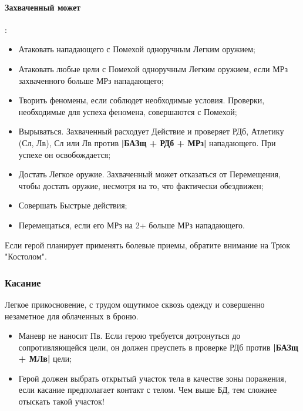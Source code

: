 \paragraph{Захваченный может}:
\begin{itemize}
  \item Атаковать нападающего с Помехой одноручным Легким оружием;
  \item Атаковать любые цели с Помехой одноручным Легким оружием, если МРз захваченного больше МРз нападающего;
  \item Творить феномены, если соблюдет необходимые условия. Проверки, необходимые для успеха феномена, совершаются с Помехой;
  \item Вырываться. Захваченный расходует Действие и проверяет РДб, Атлетику (Сл, Лв), Сл или Лв против \textbf{|БАЗщ + РДб + МРз|} нападающего. При успехе он освобождается;
  \item Достать Легкое оружие. Захваченный может отказаться от Перемещения, чтобы достать оружие, несмотря на то, что фактически обездвижен;
  \item Совершать Быстрые действия;
  \item Перемещаться, если его МРз на 2+ больше МРз нападающего. 
\end{itemize}
\begin{tcolorbox}
  Если герой планирует применять болевые приемы, обратите внимание на Трюк "Костолом".
\end{tcolorbox}

\subsubsection{Касание}
Легкое прикосновение, с трудом ощутимое сквозь одежду и совершенно незаметное для облаченных в броню.
\begin{itemize}
  \item Маневр не наносит Пв. Если герою требуется дотронуться до сопротивляющейся цели, он должен преуспеть в проверке РДб против \textbf{|БАЗщ + МЛв|} цели;
  \item \tbd Герой должен выбрать открытый участок тела в качестве зоны поражения, если касание предполагает контакт с телом. Чем выше БД, тем сложнее отыскать такой участок!
\end{itemize}


